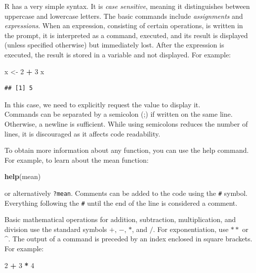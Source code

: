 \documentclass[
]{article}
\newenvironment{Shaded}{\begin{snugshade}}{\end{snugshade}}
\newcommand{\DecValTok}[1]{\textcolor[rgb]{0.00,0.00,0.81}{#1}}
\newcommand{\FunctionTok}[1]{\textcolor[rgb]{0.13,0.29,0.53}{\textbf{#1}}}
\newcommand{\NormalTok}[1]{#1}
\newcommand{\OtherTok}[1]{\textcolor[rgb]{0.56,0.35,0.01}{#1}}
\newcommand{\SpecialCharTok}[1]{\textcolor[rgb]{0.81,0.36,0.00}{\textbf{#1}}}
\begin{document}
R has a very simple syntax. It is \emph{case sensitive}, meaning it
distinguishes between uppercase and lowercase letters. The basic
commands include \emph{assignments} and \emph{expressions}. When an
expression, consisting of certain operations, is written in the prompt,
it is interpreted as a command, executed, and its result is displayed
(unless specified otherwise) but immediately lost. After the expression
is executed, the result is stored in a variable and not displayed. For
example:

\begin{Shaded}
\begin{Highlighting}[]
\NormalTok{x }\OtherTok{\textless{}{-}} \DecValTok{2} \SpecialCharTok{+} \DecValTok{3}
\NormalTok{x}
\end{Highlighting}
\end{Shaded}

\begin{verbatim}
## [1] 5
\end{verbatim}

In this case, we need to explicitly request the value to display it.\\
Commands can be separated by a semicolon (;) if written on the same
line. Otherwise, a newline is sufficient. While using semicolons reduces
the number of lines, it is discouraged as it affects code readability.

To obtain more information about any function, you can use the help
command. For example, to learn about the mean function:

\begin{Shaded}
\begin{Highlighting}[]
\FunctionTok{help}\NormalTok{(mean)}
\end{Highlighting}
\end{Shaded}

or alternatively \texttt{?mean}. Comments can be added to the code using
the \texttt{\#} symbol. Everything following the \texttt{\#} until the
end of the line is considered a comment.

Basic mathematical operations for addition, subtraction, multiplication,
and division use the standard symbols \(+\), \(-\), \(*\), and \(/\).
For exponentiation, use \(**\) or \^{}. The output of a command is
preceded by an index enclosed in square brackets. For example:

\begin{Shaded}
\begin{Highlighting}[]
\DecValTok{2} \SpecialCharTok{+} \DecValTok{3} \SpecialCharTok{*} \DecValTok{4}
\end{Highlighting}
\end{Shaded}
\end{document}
